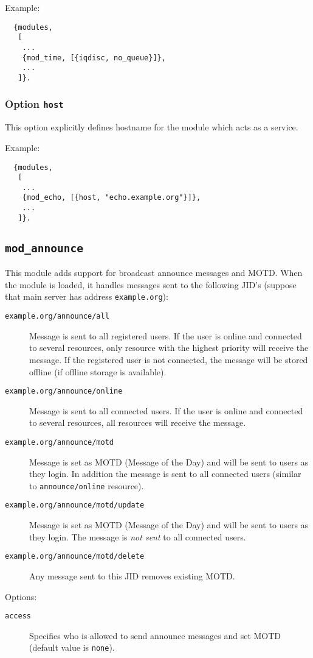\documentclass[a4paper,10pt]{article}
\newcommand{\bracehack}{\def\{{\char"7B}\def\}{\char"7D}}
\newcommand{\jid}[1]{\texttt{#1}}
\newcommand{\option}[1]{\texttt{#1}}
\newcommand{\term}[1]{\texttt{#1}}
\newcommand{\module}[1]{\texttt{#1}}
\newcommand{\modannounce}{\module{mod\_announce}}
\newcommand{\titem}[1]{\item[\bracehack\texttt{#1}]}
\begin{document}
Example:
\begin{verbatim}
  {modules,
   [
    ...
    {mod_time, [{iqdisc, no_queue}]},
    ...
   ]}.
\end{verbatim}

\subsubsection{Option \option{host}}
\label{sec:modhostoption}

This option explicitly defines hostname for the module which acts as a service.

Example:
\begin{verbatim}
  {modules,
   [
    ...
    {mod_echo, [{host, "echo.example.org"}]},
    ...
   ]}.
\end{verbatim}


\subsection{\modannounce{}}
\label{sec:modannounce}

This module adds support for broadcast announce messages and MOTD.
When the module is loaded, it handles messages sent to the following JID's
(suppose that main server has address \jid{example.org}):
\begin{description}
\titem{example.org/announce/all} Message is sent to all registered users.
If the user is online and connected to several resources, only resource with
the highest priority will receive the message. If the registered user is
not connected, the message will be stored offline (if oflline storage is
available).
\titem{example.org/announce/online} Message is sent to all connected users.
If the user is online and connected to several resources, all resources
will receive the message.
\titem{example.org/announce/motd} Message is set as MOTD (Message of the Day)
and will be sent to users as they login. In addition the message is sent to
all connected users (similar to \term{announce/online} resource).
\titem{example.org/announce/motd/update} Message is set as MOTD (Message of the Day)
and will be sent to users as they login. The message is \emph{not sent} to
all connected users.
\titem{example.org/announce/motd/delete} Any message sent to this JID
removes existing MOTD.
\end{description}

Options:
\begin{description}
\titem{access} Specifies who is allowed to send announce messages
and set MOTD (default value is \term{none}).
\end{description}
\end{document}
